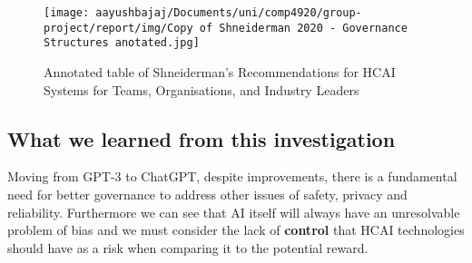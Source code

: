 \begin{figure}[h]
    \centering
    \texttt{[image: aayushbajaj/Documents/uni/comp4920/group-project/report/img/Copy of Shneiderman 2020 - Governance Structures anotated.jpg]}
    \caption{Annotated table of Shneiderman's Recommendations for HCAI Systems for Teams, Organisations, and Industry Leaders}
\end{figure}

\subsection{What we learned from this investigation}

Moving from GPT-3 to ChatGPT, despite improvements, there is a fundamental need for better governance to address other issues of safety, privacy and reliability. Furthermore we can see that AI itself will always have an unresolvable problem of bias and we must consider the lack of \textbf{control} that HCAI technologies should have as a risk when comparing it to the potential reward. 

